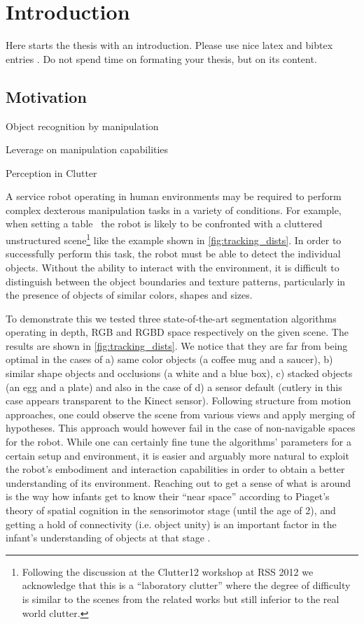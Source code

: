 \chapter{Introduction}
\label{chapter:Introduction}



Here starts the thesis with an introduction. Please use nice latex and bibtex entries \cite{latex}. Do not spend time on formating your thesis, but on its content. 
 
\section{Motivation}
\itemize 
\item Object recognition by manipulation
\item Leverage on manipulation capabilities
\item Perception in Clutter

\label{sec:intro}
A service robot operating in human environments may be
required to perform complex  dexterous manipulation tasks in a variety
of  conditions.  For example, when setting a table~\cite{iros10kcopman} the robot is likely to be
confronted with a cluttered unstructured scene\footnote{Following the discussion at the Clutter12
workshop at RSS 2012 we acknowledge that this is a ``laboratory clutter'' where the degree of difficulty
is similar to the scenes from the related works but still inferior to the real world clutter.} like the example shown
in \ref{fig:tracking_dists}.  In order to successfully perform this task,
the robot must be able  to detect the individual objects.  Without the
ability  to interact  with the  environment,  it is  difficult  to
distinguish between the object boundaries and texture patterns, particularly in the presence of objects of similar colors, shapes and sizes. 

To demonstrate this we tested three state-of-the-art segmentation algorithms operating in depth, RGB and RGBD
space respectively on the given scene. The results are shown in \ref{fig:tracking_dists}. We notice that they are far
from being optimal in the cases of a) same color objects (a coffee mug and a saucer), 
b) similar shape objects and occlusions (a white and a blue box), c) stacked objects (an egg and a plate)
and also in the case of d) a sensor
default (cutlery in this case appears transparent to the Kinect sensor). Following structure from motion
approaches, one could observe the scene from various views and apply merging of hypotheses.
This approach would however fail in the case of non-navigable spaces for the robot.
While one can certainly fine tune the algorithms' parameters for a certain setup and 
environment, it is easier and arguably more natural to exploit the robot's embodiment
and interaction capabilities in order to obtain a better understanding of its environment.
Reaching out to get a sense of what is around is the way how infants get to know their
``near space'' according to Piaget's theory of spatial cognition in the sensorimotor stage 
(until the age of 2), and getting a hold of connectivity (i.e. object unity) is an important
factor in the infant's understanding of objects at that stage \cite{infants}.

